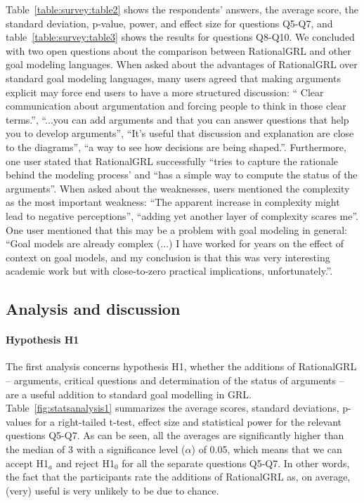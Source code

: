 Table~\ref{table:survey:table2} shows the respondents' answers, the average score, the standard deviation, p-value, power, and effect size for questions Q5-Q7, and table~\ref{table:survey:table3} shows the results for questions Q8-Q10. We concluded with two open questions about the comparison between RationalGRL and other goal modeling languages. When asked about the advantages of RationalGRL over standard goal modeling languages, many users agreed that making arguments explicit may force end users to have a more structured discussion: ``	Clear communication about argumentation and forcing people to think in those clear terms.'', ``...you can add arguments and that you can answer questions that help you to develop arguments'', ``It's useful that discussion and explanation are close to the diagrams'', ``a way to see how decisions are being shaped.''. Furthermore, one user stated that RationalGRL successfully ``tries to capture the rationale behind the modeling process' and ``has a simple way to compute the status of the arguments''. When asked about the weaknesses, users mentioned the complexity as the most important weakness: ``The apparent increase in complexity might lead to negative perceptions'', ``adding yet another layer of complexity scares me''. One user mentioned that this may be a problem with goal modeling in general: ``Goal models are already complex (...) I have worked for years on the effect of context on goal models, and my conclusion is that this was very interesting academic work but with close-to-zero practical implications, unfortunately.''.

\subsection{Analysis and discussion}

\paragraph{Hypothesis H1}
The first analysis concerns hypothesis H1, whether the additions of RationalGRL -- arguments, critical questions and determination of the status of arguments -- are a useful addition to standard goal modelling in GRL. Table~\ref{fig:statsanalysis1} summarizes the average scores, standard deviations, p-values for a right-tailed t-test, effect size and statistical power for the relevant questions Q5-Q7. As can be seen, all the averages are significantly higher than the median of 3 with a significance level ($\alpha$) of 0.05, which means that we can accept H1$_{a}$ and reject H1$_{0}$ for all the separate questions Q5-Q7. In other words, the fact that the participants rate the additions of RationalGRL as, on average, (very) useful is very unlikely to be due to chance. 

